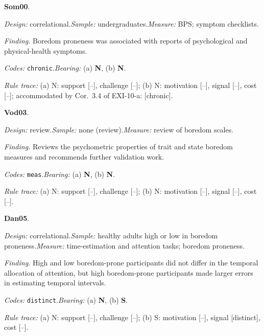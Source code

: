 \medskip
{}
\noindent\textbf{Som00}\enspace \citet{SommersVodanovich2000}.\par
{\small\noindent\textit{Design:} correlational.\quad \textit{Sample:} undergraduates.\quad \textit{Measure:} BPS; symptom checklists.\par
\noindent\textit{Finding.} Boredom proneness was associated with reports of psychological and physical-health symptoms.\par
\noindent\textit{Codes:} \texttt{chronic}.\quad \textit{Bearing:} (a) \textbf{N}, (b) \textbf{N}.\par
\noindent\textit{Rule trace:} (a) N: support {[}--{]}, challenge {[}--{]}; (b) N: motivation {[}--{]}, signal {[}--{]}, cost {[}--{]}; accommodated by Cor.~3.4 of EXI-10-a: {[}chronic{]}.\par}
\medskip
{}
\noindent\textbf{Vod03}\enspace \citet{Vodanovich2003}.\par
{\small\noindent\textit{Design:} review.\quad \textit{Sample:} none (review).\quad \textit{Measure:} review of boredom scales.\par
\noindent\textit{Finding.} Reviews the psychometric properties of trait and state boredom measures and recommends further validation work.\par
\noindent\textit{Codes:} \texttt{meas}.\quad \textit{Bearing:} (a) \textbf{N}, (b) \textbf{N}.\par
\noindent\textit{Rule trace:} (a) N: support {[}--{]}, challenge {[}--{]}; (b) N: motivation {[}--{]}, signal {[}--{]}, cost {[}--{]}.\par}
\medskip
{}
\noindent\textbf{Dan05}\enspace \citet{DanckertAllman2005}.\par
{\small\noindent\textit{Design:} correlational.\quad \textit{Sample:} healthy adults high or low in boredom proneness.\quad \textit{Measure:} time-estimation and attention tasks; boredom proneness.\par
\noindent\textit{Finding.} High and low boredom-prone participants did not differ in the temporal allocation of attention, but high boredom-prone participants made larger errors in estimating temporal intervals.\par
\noindent\textit{Codes:} \texttt{distinct}.\quad \textit{Bearing:} (a) \textbf{N}, (b) \textbf{S}.\par
\noindent\textit{Rule trace:} (a) N: support {[}--{]}, challenge {[}--{]}; (b) S: motivation {[}--{]}, signal {[}distinct{]}, cost {[}--{]}.\par}
